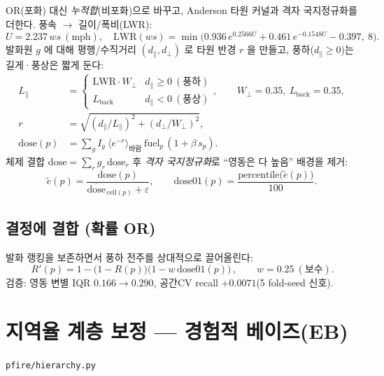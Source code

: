 \documentclass[11pt,a4paper]{article}
\newcommand{\src}[1]{{\footnotesize\color{gray}\texttt{#1}}}
\begin{document}
OR(포화) 대신 \emph{누적합}(비포화)으로 바꾸고, Anderson 타원 커널과 격자 국지정규화를
더한다. 풍속 $\to$ 길이/폭비(LWR):
\begin{equation}
U=2.237\,ws\ (\text{mph}),\quad
\mathrm{LWR}(ws)=\min\!\big(0.936\,e^{0.2566U}+0.461\,e^{-0.1548U}-0.397,\ 8\big).
\end{equation}
발화원 $g$ 에 대해 평행/수직거리 $(d_\parallel,d_\perp)$ 로 타원 반경 $r$ 을 만들고,
풍하($d_\parallel\!\ge\!0$)는 길게·풍상은 짧게 둔다:
\begin{align}
L_\parallel &= \begin{cases}\mathrm{LWR}\cdot W_\perp & d_\parallel\ge 0\ (\text{풍하})\\ L_{\text{back}} & d_\parallel<0\ (\text{풍상})\end{cases},
\qquad W_\perp=0.35,\ L_{\text{back}}=0.35,\\
r &= \sqrt{(d_\parallel/L_\parallel)^2+(d_\perp/W_\perp)^2},\\[2pt]
\mathrm{dose}(p) &= \sum_{g} I_g\ \Big\langle e^{-r}\Big\rangle_{\text{바람}}\ \mathrm{fuel}_p\,(1+\beta\,s_p).
\end{align}
체제 결합 $\mathrm{dose}=\sum_r g_r\,\mathrm{dose}_r$ 후 \emph{격자 국지정규화}로
``영동은 다 높음'' 배경을 제거:
\begin{equation}
\widetilde{e}(p)=\frac{\mathrm{dose}(p)}{\overline{\mathrm{dose}}_{\,\mathrm{cell}(p)}+\varepsilon},
\qquad \mathrm{dose01}(p)=\frac{\mathrm{percentile}\big(\widetilde{e}(p)\big)}{100}.
\end{equation}

\subsection{결정에 결합 (확률 OR)}
발화 랭킹을 보존하면서 풍하 전주를 상대적으로 끌어올린다:
\begin{equation}
\boxed{\,R'(p)=1-\big(1-R(p)\big)\big(1-w\,\mathrm{dose01}(p)\big)\,},\qquad w=0.25\ (\text{보수}).
\end{equation}
검증: 영동 변별 IQR $0.166\!\to\!0.290$, 공간CV recall $+0.0071$(5 fold-seed 신호).

\section{지역율 계층 보정 — 경험적 베이즈(EB)}
\src{pfire/hierarchy.py}
\end{document}
